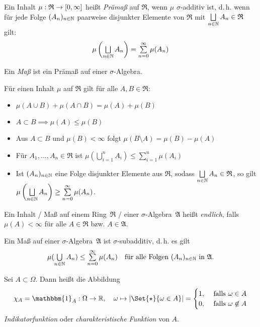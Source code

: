 \documentclass{cheat-sheet}
\newcommand{\Alg}{\mathfrak{A}} %
\newcommand{\Ring}{\mathfrak{R}} %
\newcommand{\ind}{\mathbbm{1}} %
\theoremstyle{definition}
\begin{document}
\begin{defn}
  Ein Inhalt $\mu : \Ring \to \cinterval{0}{\infty}$ heißt \emph{Prämaß} auf $\Ring$, wenn $\mu$ $\sigma$-additiv ist, d.\,h. wenn für jede Folge $(A_n)_{n \in \mathbb{N}}$ paarweise disjunkter Elemente von $\Ring$ mit $\bigsqcup_{n \in \N} A_n \in \Ring$ gilt:
  \[ \mu\left(\bigsqcup_{n \in \N} A_n\right) = \sum_{n=0}^\infty \mu(A_n) \]
\end{defn}


\begin{defn}
  Ein \emph{Maß} ist ein Prämaß auf einer $\sigma$-Algebra.
\end{defn}

\begin{satz}
  Für einen Inhalt $\mu$ auf $\Ring$ gilt für alle $A, B \in \Ring$:
  \begin{itemize}
    \item $\mu(A \cup B) + \mu(A \cap B) = \mu(A) + \mu(B)$
    \item $A \subset B \implies \mu(A) \leq \mu(B)$ 
    \item Aus $A \subset B$ und $\mu(B) < \infty$ folgt $\mu(B \setminus A) = \mu(B) - \mu(A)$
    \item Für $A_1, ..., A_n \in \Ring$ ist $\mu\left(\bigcup_{i = 1}^n A_i \right) \leq \sum_{i = 1}^n \mu(A_i)$ 
    \item Ist $(A_n)_{n \in \mathbb{N}}$ eine Folge disjunkter Elemente aus $\Ring$, sodass $\bigsqcup_{n \in \N} A_n \in \Ring$, so gilt $\mu \left( \bigsqcup_{n \in \N} A_n \right) \geq \sum_{n=0}^\infty \mu(A_n)$.
  \end{itemize}
\end{satz}

\begin{defn}
  Ein Inhalt / Maß auf einem Ring~$\Ring$ / einer $\sigma$-Algebra~$\Alg$ heißt \emph{endlich}, falls $\mu(A) < \infty$ für alle $A \in \Ring$ bzw. $A \in \Alg$.
\end{defn}

\begin{satz}
  Ein Maß auf einer $\sigma$-Algebra~$\Alg$ ist $\sigma$-subadditiv, d.\,h. es gilt
  \[ \mu(\bigcup_{n \in \N} A_n) \leq \sum_{n=0}^\infty \mu(A_n) \quad \text{für alle Folgen $(A_n)_{n \in \N}$ in $\Alg$}. \]
\end{satz}

\begin{defn}
  Sei $A \subset \Omega$. Dann heißt die Abbildung
  \[ \chi_A = \ind_A : \Omega \to \R, \quad \omega \mapsto \abs{\Set{ \star }{ \omega \in A }} = \begin{cases} 1, & \text{ falls } \omega \in A \\ 0, & \text{ falls } \omega \not\in A \end{cases} \]
  \emph{Indikatorfunktion} oder \emph{charakteristische Funktion} von $A$.
\end{defn}
\end{document}
